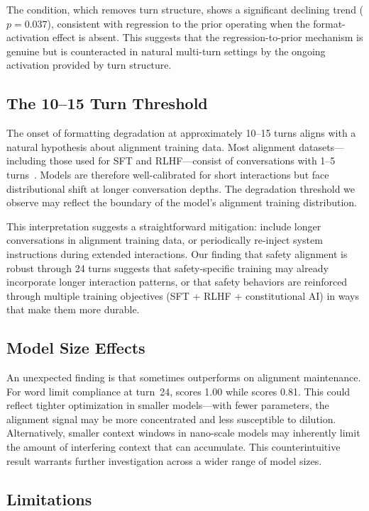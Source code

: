 The \concat condition, which removes turn structure, shows a significant declining trend ($p = 0.037$), consistent with regression to the prior operating when the format-activation effect is absent. This suggests that the regression-to-prior mechanism is genuine but is counteracted in natural multi-turn settings by the ongoing activation provided by turn structure.

\subsection{The 10--15 Turn Threshold}

The onset of formatting degradation at approximately 10--15 turns aligns with a natural hypothesis about alignment training data. Most alignment datasets---including those used for SFT and RLHF---consist of conversations with 1--5 turns~\citep{shi2024multiturn_rlhf}. Models are therefore well-calibrated for short interactions but face distributional shift at longer conversation depths. The degradation threshold we observe may reflect the boundary of the model's alignment training distribution.

This interpretation suggests a straightforward mitigation: include longer conversations in alignment training data, or periodically re-inject system instructions during extended interactions. Our finding that safety alignment is robust through 24 turns suggests that safety-specific training may already incorporate longer interaction patterns, or that safety behaviors are reinforced through multiple training objectives (SFT + RLHF + constitutional AI) in ways that make them more durable.

\subsection{Model Size Effects}

An unexpected finding is that \gptnano sometimes outperforms \gptmini on alignment maintenance. For word limit compliance at turn~24, \gptnano scores 1.00 while \gptmini scores 0.81. This could reflect tighter optimization in smaller models---with fewer parameters, the alignment signal may be more concentrated and less susceptible to dilution. Alternatively, smaller context windows in nano-scale models may inherently limit the amount of interfering context that can accumulate. This counterintuitive result warrants further investigation across a wider range of model sizes.

\subsection{Limitations}
\label{sec:limitations}


